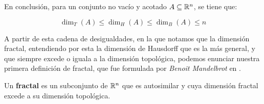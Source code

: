 En conclusión, para un conjunto no vacío y acotado $A\subseteq\mathbb{R}^n$, se tiene que:

\begin{equation}
  \label{eq:desigualdades-dimensiones}
  \dim_T(A)\leq\dim_H(A)\leq\dim_B(A)\leq n
\end{equation}

A partir de esta cadena de desigualdades, en la que notamos que la dimensión fractal, entendiendo por esta la dimensión de Hausdorff que es la más general, y que siempre excede o iguala a la dimensión topológica, podemos enunciar nuestra primera definición de fractal, que fue formulada por \textit{Benoit Mandelbrot} en \cite{alma991007242979704990}.

\begin{definicion}[Fractal]
\label{def:fractal}
Un \textbf{fractal} es un subconjunto de $\mathbb{R}^n$ que es autosimilar y cuya dimensión fractal excede a su dimensión topológica.
\end{definicion}